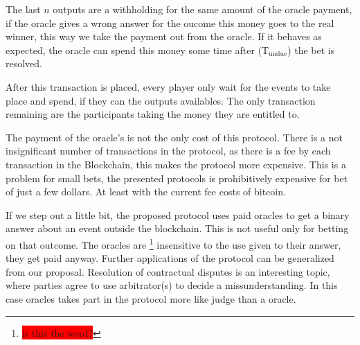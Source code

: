 The last $n$ outputs are a withholding for the same amount of the oracle
  payment, if the oracle gives a wrong answer for the oucome this money
  goes to the real winner, this way we take the payment out from the oracle.
If it behaves as expected, the oracle can spend this money some time after
  (T$_{\text{undue}}$) the bet is resolved.

After this transaction is placed, every player only wait for the events to take
  place and spend, if they can the outputs availables. The only transaction
  remaining are the participants taking the money they are entitled to.



The payment of the oracle's is not the only cost of this protocol.
There is a not insignificant number of transactions in the protocol, as there
  is a fee by each transaction in the Blockchain, this makes the protocol more
  expensive.
This is a problem for small bets, the presented protocols is prohibitively
  expensive for bet of just a few dollars. At least with the current fee costs
  of bitcoin.

If we step out a little bit, the proposed protocol uses paid oracles to get a
  binary answer about an event outside the blockchain. This is not useful only
  for betting on that outcome. The oracles are \footnote{\colorbox{red}{
  is this the word?}} insensitive to the use given to their answer, they get
  paid anyway. Further applications of the protocol can be generalized from our
  proposal.
Resolution of contractual disputes is an interesting topic, where parties agree
  to use arbitrator(s) to decide a missunderstanding.
In this case oracles takes part in the protocol more like judge than a oracle.
